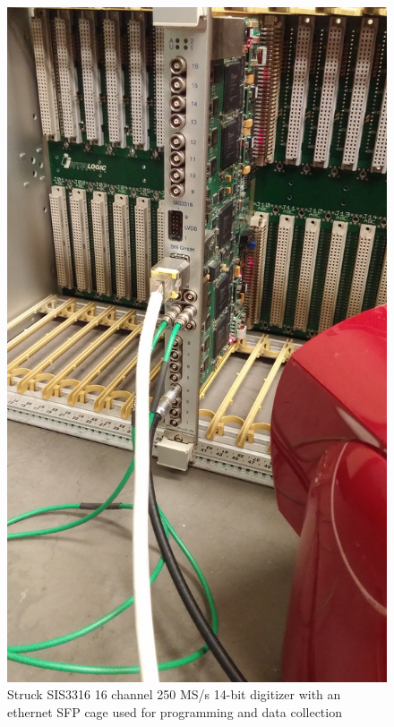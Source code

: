 \documentclass[]{article}
\begin{document}
\begin{figure}
  \centering
  \includegraphics[width=\textwidth, angle=270]{sis3316.jpg}
  \caption{Struck SIS3316 16 channel 250 MS/s 14-bit digitizer with an ethernet SFP cage
  used for programming and data collection}
\end{figure}
\end{document}
